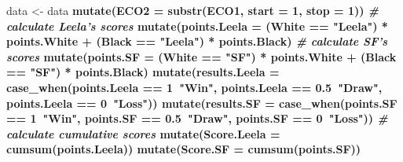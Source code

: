 \documentclass[]{article}
\newenvironment{Shaded}{\begin{snugshade}}{\end{snugshade}}
\newcommand{\CommentTok}[1]{\textcolor[rgb]{0.56,0.35,0.01}{\textit{#1}}}
\newcommand{\DataTypeTok}[1]{\textcolor[rgb]{0.13,0.29,0.53}{#1}}
\newcommand{\DecValTok}[1]{\textcolor[rgb]{0.00,0.00,0.81}{#1}}
\newcommand{\FloatTok}[1]{\textcolor[rgb]{0.00,0.00,0.81}{#1}}
\newcommand{\KeywordTok}[1]{\textcolor[rgb]{0.13,0.29,0.53}{\textbf{#1}}}
\newcommand{\NormalTok}[1]{#1}
\newcommand{\OperatorTok}[1]{\textcolor[rgb]{0.81,0.36,0.00}{\textbf{#1}}}
\newcommand{\StringTok}[1]{\textcolor[rgb]{0.31,0.60,0.02}{#1}}
\begin{document}
\begin{Shaded}
\begin{Highlighting}[]
\NormalTok{data <-}\StringTok{ }\NormalTok{data }\OperatorTok{%>%}
\StringTok{  }\KeywordTok{mutate}\NormalTok{(}\DataTypeTok{ECO2 =} \KeywordTok{substr}\NormalTok{(ECO1, }\DataTypeTok{start =} \DecValTok{1}\NormalTok{, }\DataTypeTok{stop =} \DecValTok{1}\NormalTok{)) }\OperatorTok{%>%}
\StringTok{  }\CommentTok{# calculate Leela's scores}
\StringTok{  }\KeywordTok{mutate}\NormalTok{(}\DataTypeTok{points.Leela =}\NormalTok{ (White }\OperatorTok{==}\StringTok{ "Leela"}\NormalTok{) }\OperatorTok{*}\StringTok{ }\NormalTok{points.White }\OperatorTok{+}\StringTok{ }\NormalTok{(Black }\OperatorTok{==}\StringTok{ "Leela"}\NormalTok{) }\OperatorTok{*}\StringTok{ }\NormalTok{points.Black) }\OperatorTok{%>%}
\StringTok{  }\CommentTok{# calculate SF's scores}
\StringTok{  }\KeywordTok{mutate}\NormalTok{(}\DataTypeTok{points.SF =}\NormalTok{ (White }\OperatorTok{==}\StringTok{ "SF"}\NormalTok{) }\OperatorTok{*}\StringTok{ }\NormalTok{points.White }\OperatorTok{+}\StringTok{ }\NormalTok{(Black }\OperatorTok{==}\StringTok{ "SF"}\NormalTok{) }\OperatorTok{*}\StringTok{ }\NormalTok{points.Black) }\OperatorTok{%>%}
\StringTok{  }\KeywordTok{mutate}\NormalTok{(}\DataTypeTok{results.Leela =} \KeywordTok{case_when}\NormalTok{(points.Leela }\OperatorTok{==}\StringTok{ }\DecValTok{1}\OperatorTok{~}\StringTok{"Win"}\NormalTok{, }
\NormalTok{                                   points.Leela }\OperatorTok{==}\StringTok{ }\FloatTok{0.5}\OperatorTok{~}\StringTok{"Draw"}\NormalTok{,}
\NormalTok{                                   points.Leela }\OperatorTok{==}\StringTok{ }\DecValTok{0}\OperatorTok{~}\StringTok{"Loss"}\NormalTok{)) }\OperatorTok{%>%}
\StringTok{  }\KeywordTok{mutate}\NormalTok{(}\DataTypeTok{results.SF =} \KeywordTok{case_when}\NormalTok{(points.SF }\OperatorTok{==}\StringTok{ }\DecValTok{1}\OperatorTok{~}\StringTok{"Win"}\NormalTok{, }
\NormalTok{                                   points.SF }\OperatorTok{==}\StringTok{ }\FloatTok{0.5}\OperatorTok{~}\StringTok{"Draw"}\NormalTok{,}
\NormalTok{                                   points.SF }\OperatorTok{==}\StringTok{ }\DecValTok{0}\OperatorTok{~}\StringTok{"Loss"}\NormalTok{)) }\OperatorTok{%>%}
\StringTok{  }\CommentTok{# calculate cumulative scores}
\StringTok{  }\KeywordTok{mutate}\NormalTok{(}\DataTypeTok{Score.Leela =} \KeywordTok{cumsum}\NormalTok{(points.Leela)) }\OperatorTok{%>%}
\StringTok{  }\KeywordTok{mutate}\NormalTok{(}\DataTypeTok{Score.SF =} \KeywordTok{cumsum}\NormalTok{(points.SF)) }\OperatorTok{%>%}
}}}}}}}}
\end{Highlighting}
\end{Shaded}
\end{document}
